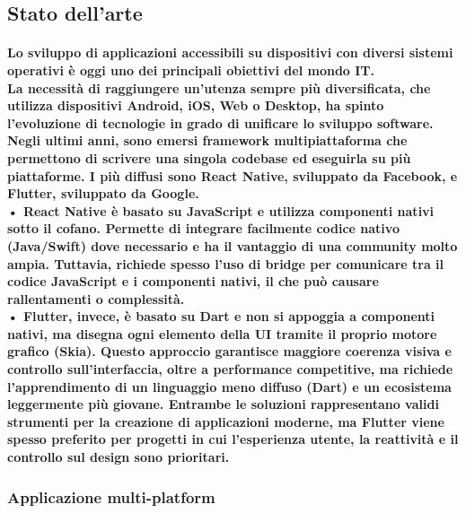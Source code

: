 \subsection{Stato dell’arte}

\paragraph{Lo sviluppo di applicazioni accessibili su dispositivi con diversi sistemi 
operativi è oggi uno dei principali obiettivi del mondo IT.\\ 
La necessità di raggiungere un'utenza sempre più diversificata, 
che utilizza dispositivi Android, iOS, Web o Desktop, ha spinto l’evoluzione di tecnologie in grado 
di unificare lo sviluppo software.
Negli ultimi anni, sono emersi framework multipiattaforma che permettono 
di scrivere una singola codebase ed eseguirla su più piattaforme. 
I più diffusi sono React Native, sviluppato da Facebook, e Flutter, sviluppato da Google.
\\•	React Native è basato su JavaScript e utilizza componenti nativi sotto il cofano. Permette di integrare facilmente codice nativo (Java/Swift) dove necessario e ha il vantaggio di una community molto ampia. Tuttavia, richiede spesso l’uso di bridge per comunicare tra il codice JavaScript e i componenti nativi, il che può causare rallentamenti o complessità.
\\•	Flutter, invece, è basato su Dart e non si appoggia a componenti nativi, ma disegna ogni elemento della UI tramite il proprio motore grafico (Skia). Questo approccio garantisce maggiore coerenza visiva e controllo sull’interfaccia, oltre a performance competitive, ma richiede l’apprendimento di un linguaggio meno diffuso (Dart) e un ecosistema leggermente più giovane.
Entrambe le soluzioni rappresentano validi strumenti per la creazione di applicazioni moderne, ma Flutter viene spesso preferito per progetti in cui l’esperienza utente, la reattività e il controllo sul design sono prioritari.
}

\subsubsection{Applicazione multi-platform}

